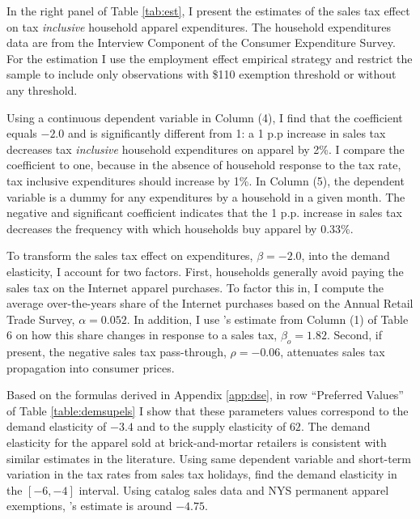 \documentclass[12pt]{article}
\begin{document}
		
	In the right panel of Table \ref{tab:est}, I present the estimates of the sales tax effect on tax \emph{inclusive} household apparel expenditures. The household expenditures data are from the Interview Component of the Consumer Expenditure Survey. For the estimation I use the employment effect empirical strategy and restrict the sample to include only observations with \$110 exemption threshold or without any threshold. 
	
	Using a continuous dependent variable in Column (4), I find that the coefficient equals $-2.0$ and is significantly different from 1: a 1 p.p increase in sales tax decreases tax \emph{inclusive} household expenditures on apparel by 2\%. I compare the coefficient to one, because in the absence of household response to the tax rate, tax inclusive expenditures should increase by 1\%. In Column (5), the dependent variable is a dummy for any expenditures by a household in a given month. The negative and significant coefficient indicates that the 1 p.p. increase in sales tax decreases the frequency with which households buy apparel by 0.33\%. 
	
	To transform the sales tax effect on expenditures, $\beta=-2.0$, into the demand elasticity, I account for two factors. First, households generally avoid paying the sales tax on the Internet apparel purchases. To factor this in, I compute the average over-the-years share of the Internet purchases based on the Annual Retail Trade Survey, $\alpha=0.052$. In addition, I use \citet{Einav}'s estimate from Column (1) of Table 6 on how this share changes in response to a sales tax, $\beta_o=1.82$. Second, if present, the negative sales tax pass-through, $\rho=-0.06$, attenuates sales tax propagation into consumer prices. 
	
	Based on the formulas derived in Appendix \ref{app:dse}, in row ``Preferred Values'' of Table \ref{table:demsupels} I show that these parameters values correspond to the demand elasticity of $-3.4$ and to the supply elasticity of $62$. 
	The demand elasticity for the apparel sold at brick-and-mortar retailers is consistent with similar estimates in the literature. Using same dependent variable and short-term variation in the tax rates from sales tax holidays, \citet{agarwals} find the demand elasticity in the $[-6,-4]$ interval. Using catalog sales data and NYS permanent apparel exemptions, \citep{hu}'s estimate is around $-4.75$.
	
\end{document}
